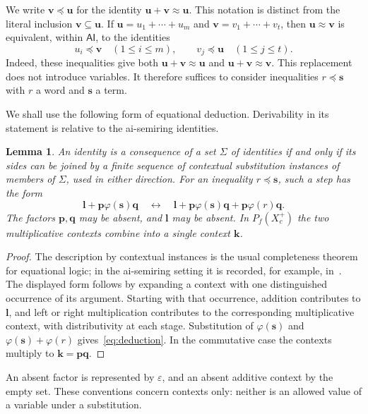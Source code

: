 \documentclass[10pt,a4paper]{amsart}
\newtheorem{lemma}[theorem]{Lemma}
\newcommand{\AI}{\mathsf{AI}}
\newcommand{\eps}{\varepsilon}
\newcommand{\bu}{\mathbf u}
\newcommand{\bv}{\mathbf v}
\newcommand{\bs}{\mathbf s}
\newcommand{\bK}{\mathbf k}
\numberwithin{equation}{section}
\begin{document}
We write $\bv\preceq\bu$ for the identity $\bu+\bv\approx\bu$.
This notation is distinct from the literal inclusion $\bv\subseteq\bu$.
If $\bu=u_1+\cdots+u_m$ and $\bv=v_1+\cdots+v_t$, then
$\bu\approx\bv$ is equivalent, within $\AI$, to the identities
\[
u_i\preceq\bv\quad(1\leq i\leq m),\qquad
v_j\preceq\bu\quad(1\leq j\leq t).
\]
Indeed, these inequalities give both $\bu+\bv\approx\bu$ and
$\bu+\bv\approx\bv$. This replacement does not introduce variables.
It therefore suffices to consider inequalities $r\preceq\bs$ with $r$ a
word and $\bs$ a term.

We shall use the following form of equational deduction. Derivability in
its statement is relative to the ai-semiring identities.

\begin{lemma}\label{lem:deduction}
An identity is a consequence of a set $\Sigma$ of identities if and only if
its sides can be joined by a finite sequence of contextual substitution
instances of members of $\Sigma$, used in either direction. For an
inequality $r\preceq\bs$, such a step has the form
\begin{equation}\label{eq:deduction}
\mathbf l+\mathbf p\varphi(\bs)\mathbf q
\quad\longleftrightarrow\quad
\mathbf l+\mathbf p\varphi(\bs)\mathbf q+
\mathbf p\varphi(r)\mathbf q.
\end{equation}
The factors $\mathbf p,\mathbf q$ may be absent, and $\mathbf l$ may be
absent. In $P_f(X_c^+)$ the two multiplicative contexts combine into a
single context $\bK$.
\end{lemma}
\begin{proof}
The description by contextual instances is the usual completeness theorem
for equational logic; in the ai-semiring setting it is recorded, for
example, in~\cite[Lemma~1.1]{RLLC}. The displayed form follows by expanding
a context with one distinguished occurrence of its argument. Starting
with that occurrence, addition contributes to $\mathbf l$, and left or
right multiplication contributes to the corresponding multiplicative
context, with distributivity at each stage. Substitution of $\varphi(\bs)$
and $\varphi(\bs)+\varphi(r)$ gives~\eqref{eq:deduction}. In the
commutative case the contexts multiply to $\bK=\mathbf p\mathbf q$.
\end{proof}

An absent factor is represented by $\eps$, and an absent additive context
by the empty set. These conventions concern contexts only: neither is an
allowed value of a variable under a substitution.
\end{document}
